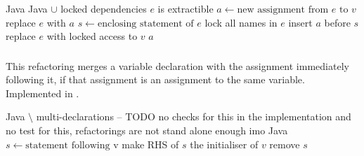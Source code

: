\begin{algorithm}
\caption{$\refactoring{Extract Assignment}(v : \type{LocalVar}, e : \type{Expr}) : \type{Assignment}$}
\label{alg:ExtractAssignment}
\begin{algorithmic}[1]
\REQUIRE Java
\ENSURE Java $\cup$ locked dependencies
\medskip
\STATE \assert $e$ is extractible
\STATE $a \leftarrow \text{new assignment from $e$ to $v$}$
  \STATE replace $e$ with $a$
\ELSE
  \STATE $s \leftarrow \text{enclosing statement of $e$}$
  \STATE lock all names in $e$
  \STATE insert $a$ before $s$
  \STATE replace $e$ with locked access to $v$
\ENDIF
\RETURN $a$
\end{algorithmic}
\end{algorithm}

\subsubsection{}
This refactoring merges a variable declaration with the assignment immediately following it, if that assignment is an assignment to the same variable. Implemented in .

\begin{algorithm}
\caption{$\refactoring{Merge Variable Declaration}(v : \type{LocalVar})$}
\label{alg:MergeVariableDeclaration}
\begin{algorithmic}[1]
\REQUIRE Java $\setminus$ multi-declarations -- TODO no checks for this in the implementation and no test for this, refactorings are not stand alone enough imo
\ENSURE Java
\medskip
{}
  \RETURN
\ENDIF
\STATE $s \leftarrow \text{statement following v}$
  \STATE make RHS of $s$ the initialiser of $v$
  \STATE remove $s$
\ENDIF
\end{algorithmic}
\end{algorithm}
